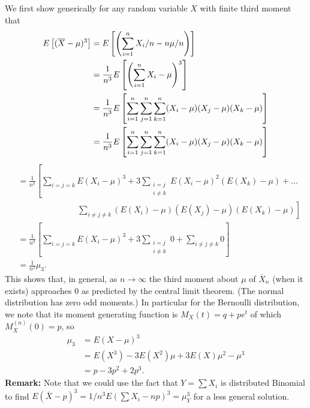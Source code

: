 \documentclass{homework}
\begin{document}
\begin{solution}
  We first show generically for any random variable $X$ with finite third moment that
  \begin{align*}
  E\left[ (\overline X - \mu)^3 \right] 
  &= E\left[ \left(\sum_{i=1}^n X_i/n - n \mu/ n \right) \right]\\
  &= \frac 1{n^3} E\left[ \left(\sum_{i=1}^n X_i - \mu \right)^3 \right]\\
  &= \frac 1{n^3} E\left[  \sum_{i=1}^n\sum_{j=1}^n\sum_{k=1}^n (X_i - \mu)(X_j - \mu)(X_k - \mu) \right] \\
  &= \frac 1{n^3} E\left[  \sum_{i=1}^n\sum_{j=1}^n\sum_{k=1}^n (X_i - \mu)(X_j - \mu)(X_k - \mu) \right] \\
  \end{align*}
  \begin{align*}
  &= \frac 1{n^3} \left[\sum_{i=j=k} E(X_i - \mu)^3 + 3 \sum_{\substack{i=j\\i\not=k}} E(X_i - \mu)^2(E(X_k) - \mu) +\dots\right.\\
  &\left.\hspace{3cm} \sum_{i\not=j\not=k} (E(X_i) - \mu)(E(X_j) - \mu)(E(X_k) - \mu)\right]\\
  &= \frac 1{n^3}\left[\sum_{i=j=k} E(X_i - \mu)^3 + 3 \sum_{\substack{i=j\\i\not=k}} 0 + \sum_{i\not=j\not=k} 0\right]\\
  &= \frac 1{n^2} \mu_3. 
  \end{align*}
  This shows that, in general, as $n\to \infty$ the third moment about $\mu$ of $\bar X_n$ (when it exists) approaches 0 as predicted by the central limit theorem. (The normal distribution has zero odd moments.)  In particular for the Bernoulli distribution, we note that its moment generating function is $M_X(t) = q + pe^t$ of which $M_X^{(n)}(0) = p$, so 
  \begin{align*}
  \mu_3 &= E(X-\mu)^3 \\
  &= E\left(X^3\right) - 3E\left(X^2\right)\mu + 3E(X) \mu^2 - \mu^3  \\
  &= p - 3p^2 + 2p^3. 
  \end{align*}
  \textbf{Remark:} Note that we could use the fact that $Y = \sum X_i$ is distributed Binomial to find $E(\bar X - p)^3 = 1/n^3 E(\sum X_i - np)^3 = \mu_Y^3$ for a less general solution. 
\end{solution}
\end{document}
